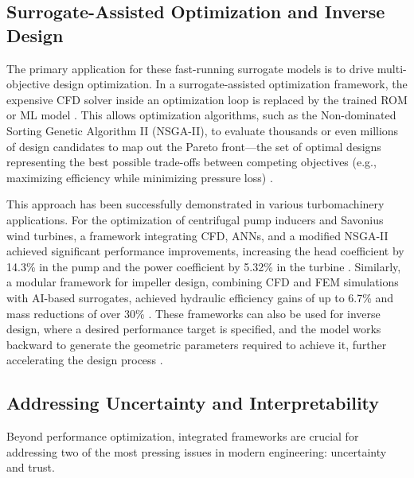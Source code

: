\documentclass[dsc, EN]{ufabcFHZh}
\begin{document}
\subsection{Surrogate-Assisted Optimization and Inverse Design}

The primary application for these fast-running surrogate models is to drive multi-objective design optimization. In a surrogate-assisted optimization framework, the expensive CFD solver inside an optimization loop is replaced by the trained ROM or ML model \citep{synthesized2024}. This allows optimization algorithms, such as the Non-dominated Sorting Genetic Algorithm II (NSGA-II), to evaluate thousands or even millions of design candidates to map out the Pareto front—the set of optimal designs representing the best possible trade-offs between competing objectives (e.g., maximizing efficiency while minimizing pressure loss) \citep{synthesized2024}.

This approach has been successfully demonstrated in various turbomachinery applications. For the optimization of centrifugal pump inducers and Savonius wind turbines, a framework integrating CFD, ANNs, and a modified NSGA-II achieved significant performance improvements, increasing the head coefficient by 14.3\% in the pump and the power coefficient by 5.32\% in the turbine \citep{synthesized2024}. Similarly, a modular framework for impeller design, combining CFD and FEM simulations with AI-based surrogates, achieved hydraulic efficiency gains of up to 6.7\% and mass reductions of over 30\% \citep{synthesized2024}. These frameworks can also be used for inverse design, where a desired performance target is specified, and the model works backward to generate the geometric parameters required to achieve it, further accelerating the design process \citep{data-driven_inverse_design}.

\subsection{Addressing Uncertainty and Interpretability}

Beyond performance optimization, integrated frameworks are crucial for addressing two of the most pressing issues in modern engineering: uncertainty and trust.
\end{document}
